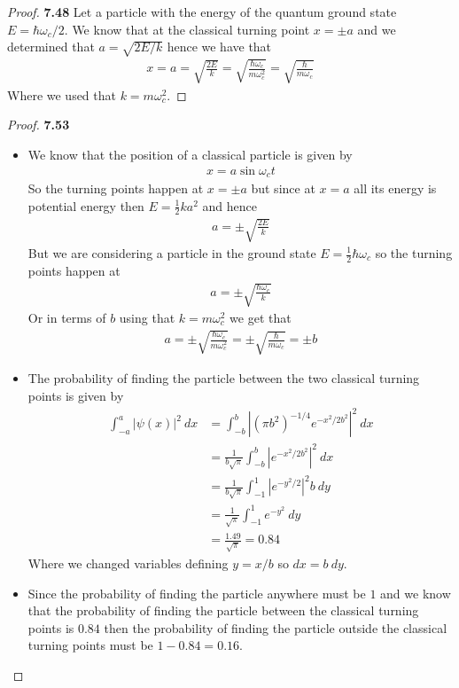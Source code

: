 \documentclass[11pt]{article}
\theoremstyle{definition}
\begin{document}
\cleardoublepage
\begin{proof}{\textbf{7.48}}
Let a particle with the energy of the quantum ground state
$E = \hbar \omega_c / 2$. We know that at the classical turning point
$x = \pm a$ and we determined that $a = \sqrt{2E/k}$ hence we have that
\begin{align*}
    x = a  = \sqrt{\frac{2E}{k}} = \sqrt{\frac{\hbar\omega_c}{m \omega_c^2}}
    = \sqrt{\frac{\hbar}{m \omega_c}}
\end{align*}
Where we used that $k = m \omega_c^2$.
\end{proof}

\cleardoublepage
\begin{proof}{\textbf{7.53}}
\begin{itemize}
\item [\textbf{(a)}]
We know that the position of a classical particle is given by
\begin{align*}
    x = a\sin\omega_c t
\end{align*}
So the turning points happen at $x = \pm a$ but since at $x = a$ all its energy
is potential energy then $E = \frac{1}{2}ka^2$ and hence
\begin{align*}
    a = \pm \sqrt{\frac{2E}{k}}
\end{align*}
But we are considering a particle in the ground state
$E = \frac{1}{2}\hbar \omega_c$ so the turning points happen at
\begin{align*}
    a = \pm \sqrt{\frac{\hbar \omega_c}{k}}
\end{align*}
Or in terms of $b$ using that $k = m\omega_c^2$ we get that
\begin{align*}
    a = \pm \sqrt{\frac{\hbar \omega_c}{m \omega_c^2}}
    = \pm \sqrt{\frac{\hbar}{m \omega_c}}
    = \pm b
\end{align*}
\item [\textbf{(b)}] The probability of finding the particle between
the two classical turning points is given by
\begin{align*}
    \int_{-a}^a |\psi(x)|^2~dx 
    &= \int_{-b}^{b} |(\pi b^2)^{-1/4} e^{-x^2/2b^2}|^2~dx\\
    &= \frac{1}{b\sqrt{\pi}} \int_{-b}^{b} |e^{-x^2/2b^2}|^2~dx\\
    &= \frac{1}{b\sqrt{\pi}} \int_{-1}^{1} |e^{-y^2/2}|^2b~dy\\
    &= \frac{1}{\sqrt{\pi}} \int_{-1}^{1} e^{-y^2}~dy\\
    &= \frac{1.49}{\sqrt{\pi}} = 0.84
\end{align*}
Where we changed variables defining $y = x/b$ so $dx = b~dy$. 
\item [\textbf{(c)}] Since the probability of finding the particle anywhere
must be $1$ and we know that the probability of finding the particle between
the classical turning points is $0.84$ then the probability of finding the
particle outside the classical turning points must be $1 - 0.84 = 0.16$.
\end{itemize}
\end{proof}
\end{document}
